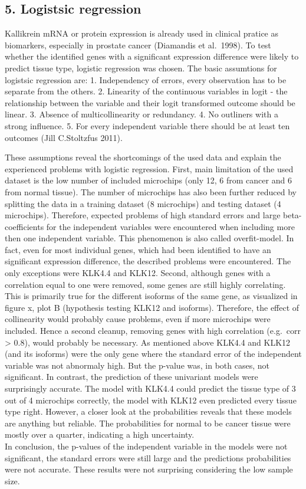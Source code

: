 \documentclass[
]{article}
\begin{document}
\hypertarget{logistsic-regression}{%
\subsection{5. Logistsic regression}\label{logistsic-regression}}

Kallikrein mRNA or protein expression is already used in clinical
pratice as biomarkers, especially in prostate cancer (Diamandis et
al.~1998). To test whether the identified genes with a significant
expression difference were likely to predict tissue type, logistic
regression was chosen. The basic assumtions for logistsic regression
are: 1. Independency of errors, every observation has to be separate
from the others. 2. Linearity of the continuous variables in logit - the
relationship between the variable and their logit transformed outcome
should be linear. 3. Absence of multicollinearity or redundancy. 4. No
outliners with a strong influence. 5. For every independent variable
there should be at least ten outcomes (Jill C.Stoltzfus 2011).

These assumptions reveal the shortcomings of the used data and explain
the experienced problems with logistic regression. First, main
limitation of the used dataset is the low number of included microchips
(only 12, 6 from cancer and 6 from normal tissue). The number of
microchips has also been further reduced by splitting the data in a
training dataset (8 microchips) and testing dataset (4 microchips).
Therefore, expected problems of high standard errors and large
beta-coefficients for the independent variables were encountered when
including more then one independent variable. This phenomenon is also
called overfit-model. In fact, even for most individual genes, which had
been identified to have an significant expression difference, the
described problems were encountered. The only exceptions were KLK4.4 and
KLK12. Second, although genes with a correlation equal to one were
removed, some genes are still highly correlating. This is primarily true
for the different isoforms of the same gene, as visualized in figure x,
plot B (hypothesis testing KLK12 and isoforms). Therefore, the effect of
collinearity would probably cause problems, even if more microchips were
included. Hence a second cleanup, removing genes with high correlation
(e.g.~corr \textgreater{} 0.8), would probably be necessary. As
mentioned above KLK4.4 and KLK12 (and its isoforms) were the only gene
where the standard error of the independent variable was not abnormaly
high. But the p-value was, in both cases, not significant. In contrast,
the prediction of these univariant models were surprisingly accurate.
The model with KLK4.4 could predict the tissue type of 3 out of 4
microchips correctly, the model with KLK12 even predicted every tissue
type right. However, a closer look at the probabilities reveals that
these models are anything but reliable. The probabilities for normal to
be cancer tissue were mostly over a quarter, indicating a high
uncertainty.\\
In conclusion, the p-values of the independent variable in the models
were not significant, the standard errors were still large and the
predictions probabilities were not accurate. These results were not
surprising considering the low sample size.
\end{document}
